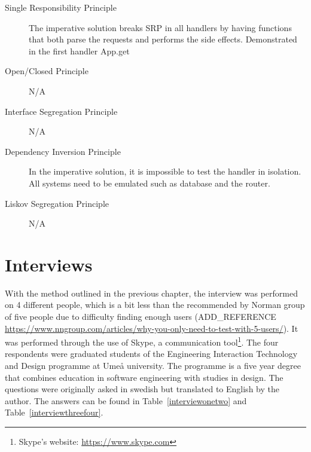 \begin{description}
	\item[Single Responsibility Principle] The imperative solution breaks SRP
in all handlers by having functions that both parse the requests and performs
the side effects. Demonstrated in the first handler App.get
	\item[Open/Closed Principle] N/A
	\item[Interface Segregation Principle] N/A
	\item[Dependency Inversion Principle] In the imperative solution, it is 
impossible to test the handler in isolation. All systems need to be emulated
such as database and the router.
	\item[Liskov Segregation Principle] N/A
\end{description}

\section{Interviews}\label{interviews}

With the method outlined in the previous chapter, the interview was performed
on 4 different people, which is a bit less than the recommended by Norman group
of five people due to difficulty finding enough users (ADD\_REFERENCE
\url{https://www.nngroup.com/articles/why-you-only-need-to-test-with-5-users/}).
It was performed through the use of Skype, a communication
tool\footnote{Skype's website: \url{https://www.skype.com}}. The four respondents were
graduated students of the Engineering Interaction Technology and Design
programme at Umeå university. The programme is a five year degree that combines
education in software engineering with studies in design. The questions were originally
asked in swedish but translated to English by the author. The answers can be found in 
Table~\ref{interviewonetwo} and Table~\ref{interviewthreefour}.

